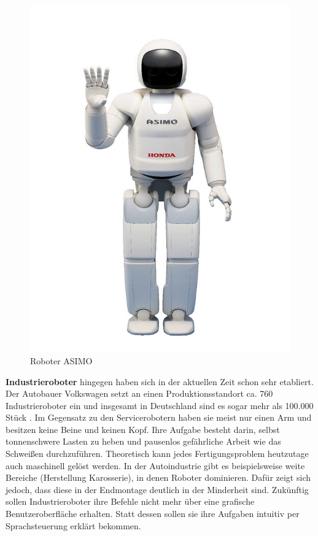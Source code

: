 \begin{figure}[H]						
	\centering							
	\includegraphics[scale=0.5]{Bilder/asimo.jpg}			
	\caption{Roboter ASIMO}						
	\label{f:asimo}						
\end{figure}

\textbf{Industrieroboter} hingegen haben sich in der aktuellen Zeit schon sehr etabliert. Der Autobauer Volkswagen setzt an einen Produktionsstandort ca. 760 Industrieroboter ein und insgesamt in Deutschland sind es sogar mehr als 100.000 Stück \cite{Haun2007}. Im Gegensatz zu den Servicerobotern haben sie meist nur einen Arm und besitzen keine Beine und keinen Kopf. Ihre Aufgabe besteht darin, selbst tonnenschwere Lasten zu heben und pausenlos gefährliche Arbeit wie das Schweißen durchzuführen. 
Theoretisch kann jedes Fertigungsproblem heutzutage auch maschinell gelöst werden. In der Autoindustrie gibt es beispielsweise weite Bereiche (Herstellung Karosserie), in denen Roboter dominieren. Dafür zeigt sich jedoch, dass diese in der Endmontage deutlich in der Minderheit sind. Zukünftig sollen Industrieroboter ihre Befehle nicht mehr über eine grafische Benutzeroberfläche erhalten. Statt dessen sollen sie ihre Aufgaben intuitiv per Sprachsteuerung erklärt bekommen\cite{Haun2007}.

